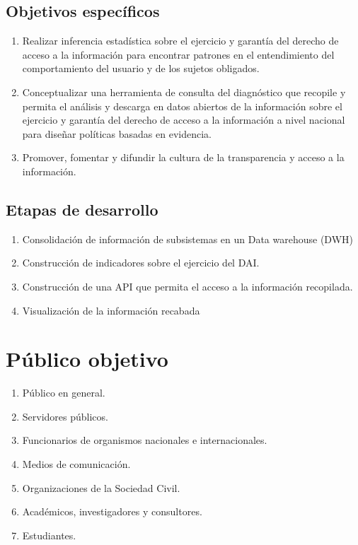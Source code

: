 \subsection{Objetivos específicos}

\begin{enumerate}
\item Realizar inferencia estadística sobre el ejercicio y garantía del derecho de acceso a la información para encontrar patrones en el entendimiento del comportamiento del usuario y de los sujetos obligados.
\item Conceptualizar una herramienta de consulta del diagnóstico que recopile y permita el análisis y descarga en datos abiertos de la información sobre el ejercicio y garantía del derecho de acceso a la información a nivel nacional para diseñar políticas basadas en evidencia.
\item Promover, fomentar y difundir la cultura de la transparencia y acceso a la información.
\end{enumerate}

\subsection{Etapas de desarrollo}


\begin{enumerate}
\item Consolidación de información de subsistemas en un Data warehouse (DWH)
\item Construcción de indicadores sobre el ejercicio del DAI.
\item Construcción de una API que permita el acceso a la información recopilada.
\item Visualización de la información recabada
\end{enumerate}
    
\section{Público objetivo}

\begin{enumerate}
\item Público en general.
\item Servidores públicos.
\item Funcionarios de organismos nacionales e internacionales.
\item Medios de comunicación.
\item Organizaciones de la Sociedad Civil.
\item Académicos, investigadores y consultores.
\item Estudiantes.
\end{enumerate}

